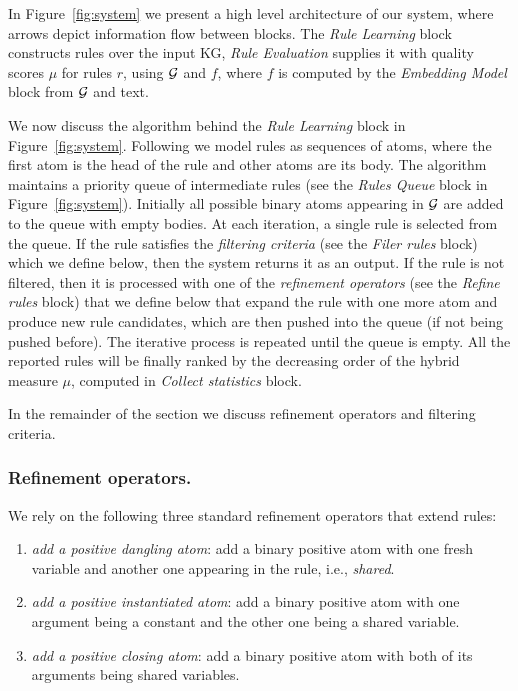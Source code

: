 In Figure~\ref{fig:system} we present a high level architecture of our system, where arrows depict information flow between blocks.
The \emph{Rule Learning} block constructs rules over the input KG, \emph{Rule Evaluation} supplies it with quality scores $\mu$ for rules $r$, using $\mathcal{G}$ and $f$, where $f$ is computed by the \emph{Embedding Model} block 
from $\mathcal{G}$ and text.




We now discuss the algorithm behind the \emph{Rule Learning} block
in Figure~\ref{fig:system}. 
Following \cite{amie} we model rules as sequences of atoms, where the first atom is the head of the rule and other atoms are its body. 
The algorithm maintains a priority queue of intermediate rules
(see the \emph{Rules Queue} block in Figure~\ref{fig:system}). 
Initially all possible binary atoms appearing in $\mathcal{G}$ are added to the queue with empty bodies. 
At each iteration, a single rule is selected from the queue. 
If the rule satisfies the \emph{filtering criteria} 
(see the \emph{Filer rules} block) 
which we define below,
then the system returns it as an output. 
If the rule is not filtered, then it is processed with one of the \emph{refinement operators} 
(see the \emph{Refine rules} block) 
that we define below that expand the rule with one more atom 
and produce new rule candidates, 
which are then pushed into the queue 
(if not being pushed before). 
The iterative process is repeated until the queue is empty. 
All the reported rules will be finally ranked by the decreasing order of the hybrid measure $\mu$, computed in \emph{Collect statistics} block.

In the remainder of the section we discuss refinement operators and filtering criteria.
 


\subsubsection{Refinement operators.}
We rely on the following three standard refinement operators \cite{amie}
that extend rules:
\begin{enumerate}[label=(\it\roman*)]
\item \textit{add a positive dangling atom}: add a binary positive atom with one fresh variable and another one appearing in the rule, i.e., \emph{shared}.
\item \textit{add a positive instantiated atom}: add a binary positive atom with one argument being a constant and the other one being a shared variable.
\item \textit{add a positive closing atom}: add a binary positive atom with both of its arguments being shared variables.
\end{enumerate}

